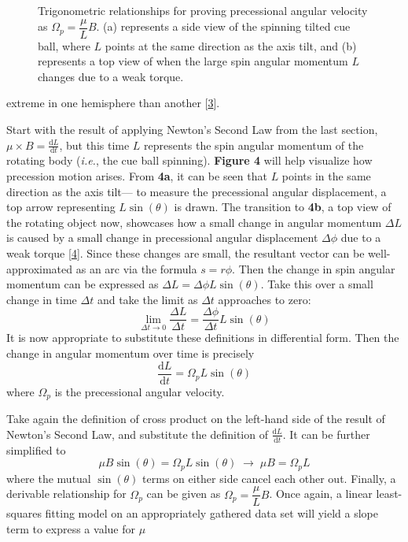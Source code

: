 \documentclass[12pt]{article}
\newcommand{\totder}[2][]{\frac{\mathrm{d}#1}{\mathrm{d}#2}} %
\begin{document}
\begin{multicols}{2}
\begin{figure}[H]
    \caption{
        Trigonometric relationships for proving precessional angular velocity
        as $\Omega_p=\dfrac{\mu}{L}B$. (a) represents a side view of the spinning
        tilted cue ball, where $L$ points at the same direction as the axis tilt,
        and (b) represents a top view of when the large spin angular momentum $L$
        changes due to a weak torque.
    }
\end{figure}
\noindent
extreme in one hemisphere than another [\hyperref[sec:3]{3}].

Start with the result of applying Newton's Second Law from the last section, $\displaystyle \mu\times B=\totder[L]{t}$,
but this time $L$ represents the spin angular momentum of the rotating body (\textit{i.e.}, the cue ball spinning).
\textbf{Figure 4} will help visualize how precession motion arises.
From \textbf{4a}, it can be seen that $L$ points in the same direction as the axis tilt---
to measure the precessional angular displacement, a top arrow representing $L\sin(\theta)$ is drawn.
The transition to \textbf{4b}, a top view of the rotating object now, showcases how a small change in angular momentum
$\Delta L$ is caused by a small change in precessional angular displacement $\Delta\phi$ due to a weak torque [\hyperref[sec:4]{4}].
Since these changes are small, the resultant vector can be well-approximated as an arc via the formula $s=r\phi$.
Then the change in spin angular momentum can be expressed as $\Delta L=\Delta\phi L\sin(\theta)$.
Take this over a small change in time $\Delta t$ and take the limit as $\Delta t$ approaches to zero:
$$\lim_{\Delta t\to0}\frac{\Delta L}{\Delta t}=\frac{\Delta\phi}{\Delta t}L\sin(\theta)$$
It is now appropriate to substitute these definitions in differential form. Then the change in angular momentum
over time is precisely
$$\totder[L]{t}=\Omega_p L\sin(\theta)$$
where $\Omega_p$ is the precessional angular velocity.

Take again the definition of cross product on the left-hand side of the result of Newton's Second Law,
and substitute the definition of $\displaystyle \totder[L]{t}$. It can be further simplified to
$$\mu B\sin(\theta)=\Omega_pL\sin(\theta)\;\longrightarrow\;\mu B=\Omega_pL$$
where the mutual $\sin(\theta)$ terms on either side cancel each other out.
Finally, a derivable relationship for $\Omega_p$ can be given as $\Omega_p=\dfrac{\mu}{L}B$.
Once again, a linear least-squares fitting model on an appropriately gathered data set will yield a slope term
to express a value for $\mu$


\end{multicols}
\end{document}
